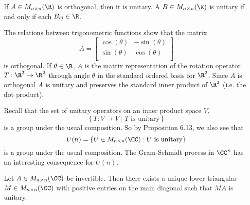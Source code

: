 \documentclass[linearalgebraII]{subfiles}
\begin{document}
    \begin{remark}
        If $A\in M_{n\times n}(\R)$ is orthogonal, then it is unitary. A $B\in M_{n\times n}(\K)$ is unitary if and only if each $B_{ij}\in\R$.
    \end{remark}

    \begin{example}
        The relations between trigonometric functions show that the matrix
        \begin{equation*}
            A =
            \begin{bmatrix}
                \cos(\theta) & -\sin(\theta) \\
                \sin(\theta) & \cos(\theta) \\
            \end{bmatrix}
        \end{equation*}
        is orthogonal. If $\theta\in\R$, $A$ is the matrix representation of the rotation operator $T:\R^2\to\R^2$ through angle $\theta$ in the standard ordered basis for $\R^2$. Since $A$ is orthogonal $A$ is unitary and preserves the standard inner product of $\R^2$ (i.e. the dot product).
    \end{example}

    \begin{remark}
        Recall that the set of unitary operators on an inner product space $V$,
        \begin{equation*}
            \left\lbrace T:V\to V\mid T\text{ is unitary} \right\rbrace 
        \end{equation*}
        is a group under the usual composition. So by Proposition 6.13, we also see that
        \begin{equation*}
            U(n) = \left\lbrace U\in M_{n\times n}(\CC): U\text{ is unitary} \right\rbrace 
        \end{equation*}
        is a group under the usual composition. The Gram-Schmidt process in $\CC^n$ has an interesting consequence for $U(n)$.
    \end{remark}

    \clearpage
    \begin{prop}{}
        Let $A\in M_{n\times n}(\CC)$ be invertible. Then there exists a unique lower triangular $M\in M_{n\times n}(\CC)$ with positive entries on the main diagonal such that $MA$ is unitary.
    \end{prop}
\end{document}
